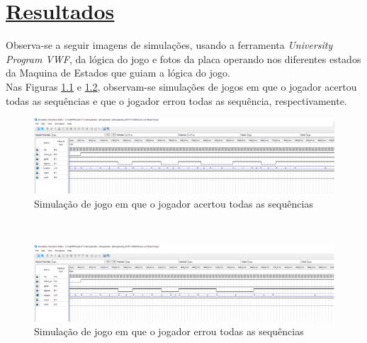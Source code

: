 \documentclass[14pt, oneside]{book}
\newcommand\tab[1][1cm]{\hspace*{#1}}
\theoremstyle{definition}
\begin{document}
         
         \chapter[Resultados]{\hyperlink{toc}{Resultados}}
            
            \tab Observa-se a seguir imagens de simulações, usando a ferramenta \textit{University Program VWF}, da lógica do jogo e fotos da placa operando nos diferentes estados da Maquina de Estados que guiam a lógica do jogo. \\
            \tab Nas Figuras \ref{acertou} e \ref{errou}, observam-se simulações de jogos em que o jogador acertou todas as sequências e que o jogador errou todas as sequência, respectivamente. \\
            
                \begin{figure}[H]
                    \centering
                    \hspace*{-1.5cm} 
                    \includegraphics[scale=0.41]{logica_jogo_acertou_zoom.png}
                    \caption{Simulação de jogo em que o jogador acertou todas as sequências}
                    \label{acertou}
                \end{figure} \\
                
                \begin{figure}[H]
                    \centering
                    \hspace*{-1.5cm} 
                    \includegraphics[scale=0.41]{logica_jogo_errou_zoom.png}
                    \caption{Simulação de jogo em que o jogador errou todas as sequências}
                    \label{errou}
                \end{figure}
                
\end{document}
